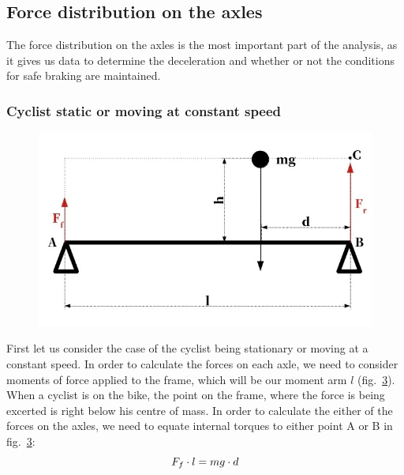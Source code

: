 \documentclass[12pt, a4]{article}
\begin{document}
\begin{figure}[h]
\begin{subfigure}[b]{0.3\linewidth}
\caption{}%
\label{fig:beam_diagram}
\end{subfigure}%
\label{fig:theoretical_models}
\end{figure}

\subsection{Force distribution on the axles}
The force distribution on the axles is the most important part of the analysis, as it gives us data to 
determine the deceleration and whether or not the conditions for safe braking are maintained.

\subsubsection{Cyclist static or moving at constant speed}
\begin{figure}[H]
\centering
\caption{}
\includegraphics[width=\linewidth]{static_forces_simplified}%
\label{fig:static_diagram}
\end{figure}
First let us consider the case of the cyclist being stationary or moving at a constant speed. In order to 
calculate the forces on each axle, we need to consider moments of force applied to the frame, which will be
our moment arm $l$ (fig.~\ref{fig:static_diagram}). When a cyclist is on the bike, the point on the frame, where
the force is being excerted is right below his centre of mass. In order to calculate the either of the forces 
on the axles, we need to equate internal torques to either point A or B in fig.~\ref{fig:static_diagram}: 
\begin{equation}
\centering%
\label{eq:equating_torques}
F_f \cdot l = mg \cdot d
\end{equation}
\end{document}
